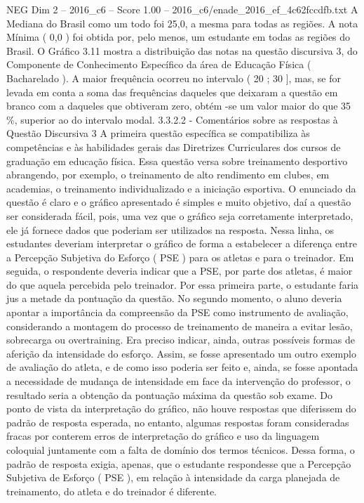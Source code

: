 \begin{textsample}{NEG Dim 2 – 2016\_c6 – Score 1.00 – 2016\_c6/enade\_2016\_ef\_4c62fccdfb.txt}
A Mediana do Brasil como um todo foi 25,0, a mesma para todas as regiões.
A nota Mínima ( 0,0 ) foi obtida por, pelo menos, um estudante em todas as regiões do Brasil.
O Gráfico 3.11 mostra a distribuição das notas na questão discursiva 3, do Componente de Conhecimento Específico da área de Educação Física ( Bacharelado ).
A maior frequência ocorreu no intervalo ( 20 ; 30 ], mas, se for levada em conta a soma das frequências daqueles que deixaram a questão em branco com a daqueles que obtiveram zero, obtém -se um valor maior do que 35 \%, superior ao do intervalo modal. 3.3.2.2 - Comentários sobre as respostas à Questão Discursiva 3 A primeira questão específica se compatibiliza às competências e às habilidades gerais das Diretrizes Curriculares dos cursos de graduação em educação física.
Essa questão versa sobre treinamento desportivo abrangendo, por exemplo, o treinamento de alto rendimento em clubes, em academias, o treinamento individualizado e a iniciação esportiva.
O enunciado da questão é claro e o gráfico apresentado é simples e muito objetivo, daí a questão ser considerada fácil, pois, uma vez que o gráfico seja corretamente interpretado, ele já fornece dados que poderiam ser utilizados na resposta.
Nessa linha, os estudantes deveriam interpretar o gráfico de forma a estabelecer a diferença entre a Percepção Subjetiva do Esforço ( PSE ) para os atletas e para o treinador.
Em seguida, o respondente deveria indicar que a PSE, por parte dos atletas, é maior do que aquela percebida pelo treinador.
Por essa primeira parte, o estudante faria jus a metade da pontuação da questão.
No segundo momento, o aluno deveria apontar a importância da compreensão da PSE como instrumento de avaliação, considerando a montagem do processo de treinamento de maneira a evitar lesão, sobrecarga ou overtraining.
Era preciso indicar, ainda, outras possíveis formas de aferição da intensidade do esforço.
Assim, se fosse apresentado um outro exemplo de avaliação do atleta, e de como isso poderia ser feito e, ainda, se fosse apontada a necessidade de mudança de intensidade em face da intervenção do professor, o resultado seria a obtenção da pontuação máxima da questão sob exame.
Do ponto de vista da interpretação do gráfico, não houve respostas que diferissem do padrão de resposta esperada, no entanto, algumas respostas foram consideradas fracas por conterem erros de interpretação do gráfico e uso da linguagem coloquial juntamente com a falta de domínio dos termos técnicos.
Dessa forma, o padrão de resposta exigia, apenas, que o estudante respondesse que a Percepção Subjetiva de Esforço ( PSE ), em relação à intensidade da carga planejada de treinamento, do atleta e do treinador é diferente.

\end{textsample}
